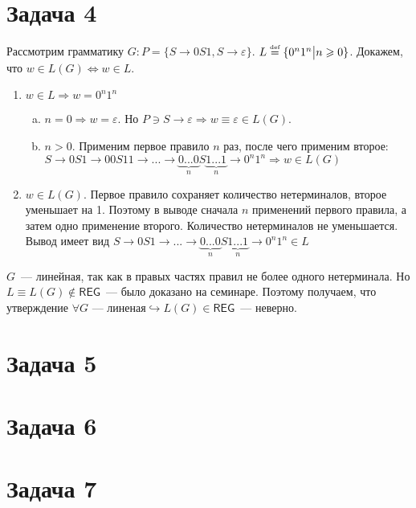 \documentclass[a4paper]{article}
\def\REG{{\mathsf{REG}}}
\def\eqdef{\overset{\mbox{\tiny def}}{=}}
\begin{document}
\section*{Задача 4}
Рассмотрим грамматику $G\colon P=\{S\longrightarrow 0S1,S\longrightarrow \varepsilon\}$. $L\eqdef\{0^n1^n\big| n\geqslant 0\}$. Докажем, что $w\in L(G)\Leftrightarrow w\in L$.
\begin{enumerate}
\item $w\in L\Rightarrow w=0^n1^n$\begin{enumerate}[a.]
\item $n=0\Rightarrow w=\varepsilon$. Но $P\ni S\longrightarrow \varepsilon\Rightarrow w\equiv\varepsilon\in L(G)$.
\item $n>0$. Применим первое правило $n$ раз, после чего применим второе: $S\longrightarrow 0S1\longrightarrow 00S11\longrightarrow...\longrightarrow \underbrace{0...0}_{n}S\underbrace{1...1}_n\longrightarrow 0^n1^n\Rightarrow w\in L(G)$
\end{enumerate}
\item $w\in L(G)$. Первое правило сохраняет количество нетерминалов, второе уменьшает на 1. Поэтому в выводе сначала $n$ применений первого правила, а затем одно применение второго. Количество нетерминалов не уменьшается. Вывод имеет вид $S\longrightarrow 0S1\longrightarrow...\longrightarrow \underbrace{0...0}_nS\underbrace{1...1}_n\longrightarrow 0^n1^n\in L$
\end{enumerate}
$G$~--- линейная, так как в правых частях правил не более одного нетерминала. Но $L\equiv L(G)\notin\REG$~--- было доказано на семинаре. Поэтому получаем, что утверждение $\forall G\mbox{~--- линеная}\hookrightarrow L(G)\in\REG$~--- неверно.
\section*{Задача 5}
\section*{Задача 6}
\section*{Задача 7}
\end{document}
